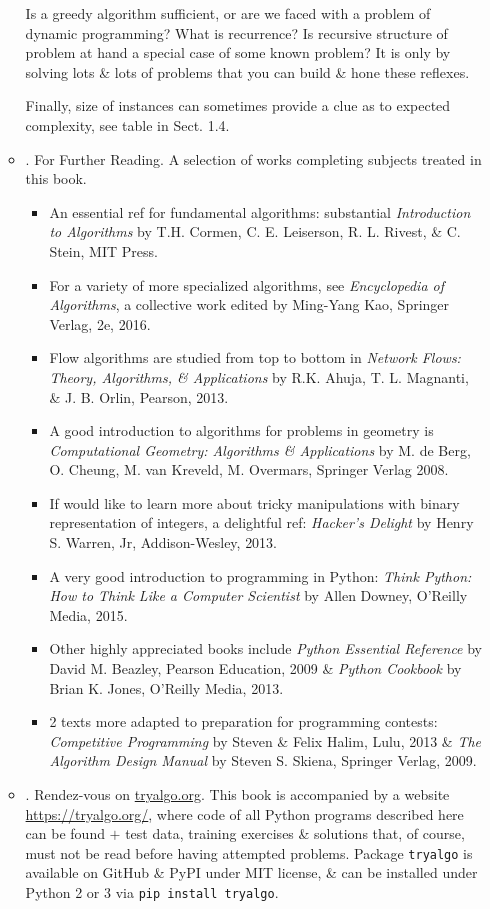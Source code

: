 \documentclass{article}
\begin{document}
\begin{itemize}
\begin{itemize}
		Is a greedy algorithm sufficient, or are we faced with a problem of dynamic programming? What is recurrence? Is recursive structure of problem at hand a special case of some known problem? It is only by solving lots \& lots of problems that you can build \& hone these reflexes.
		
		Finally, size of instances can sometimes provide a clue as to expected complexity, see table in Sect. 1.4.
		\item {. For Further Reading.} A selection of works completing subjects treated in this book.
		\begin{itemize}
			\item An essential ref for fundamental algorithms: substantial {\it Introduction to Algorithms} by {\sc T.H. Cormen, C. E. Leiserson, R. L. Rivest, \& C. Stein}, MIT Press.
			\item For a variety of more specialized algorithms, see {\it Encyclopedia of Algorithms}, a collective work edited by {\sc Ming-Yang Kao}, Springer Verlag, 2e, 2016.
			\item Flow algorithms are studied from top to bottom in {\it Network Flows: Theory, Algorithms, \& Applications} by {\sc R.K. Ahuja, T. L. Magnanti, \& J. B. Orlin}, Pearson, 2013.
			\item A good introduction to algorithms for problems in geometry is {\it Computational Geometry: Algorithms \& Applications} by {\sc M. de Berg, O. Cheung, M. van Kreveld, M. Overmars}, Springer Verlag 2008.
			\item If would like to learn more about tricky manipulations with binary representation of integers, a delightful ref: {\it Hacker's Delight} by {\sc Henry S. Warren, Jr}, Addison-Wesley, 2013.
			\item A very good introduction to programming in Python: {\it Think Python: How to Think Like a Computer Scientist} by {\sc Allen Downey}, O'Reilly Media, 2015.
			\item Other highly appreciated books include {\it Python Essential Reference} by {\sc David M. Beazley}, Pearson Education, 2009 \& {\it Python Cookbook} by {\sc Brian K. Jones}, O'Reilly Media, 2013.
			\item 2 texts more adapted to preparation for programming contests: {\it Competitive Programming} by {\sc Steven \& Felix Halim}, Lulu, 2013 \& {\it The Algorithm Design Manual} by {\sc Steven S. Skiena}, Springer Verlag, 2009.
		\end{itemize}
		\item {. Rendez-vous on \url{tryalgo.org}.} This book is accompanied by a website \url{https://tryalgo.org/}, where code of all Python programs described here can be found $+$ test data, training exercises \& solutions that, of course, must not be read before having attempted problems. Package {\tt tryalgo} is available on GitHub \& PyPI under MIT license, \& can be installed under Python 2 or 3 via {\tt pip install tryalgo}.

\end{itemize}
\end{itemize}
\end{document}
